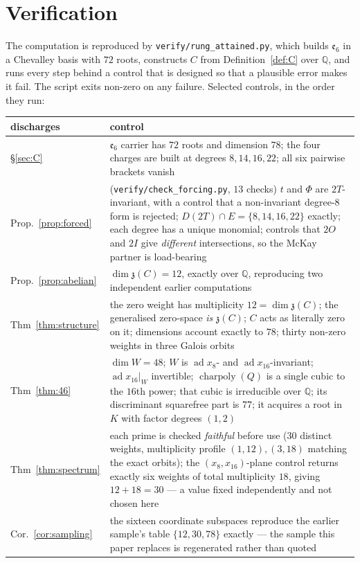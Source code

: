 \documentclass[11pt,a4paper]{article}
\theoremstyle{definition}
\theoremstyle{remark}
\newcommand{\esix}{\mathfrak{e}_6}
\newcommand{\z}{\mathfrak{z}}
\newcommand{\Q}{\mathbb{Q}}
\newcommand{\ad}{\operatorname{ad}}
\newcommand{\charpoly}{\operatorname{charpoly}}
\begin{document}
\appendix

\section{Verification}\label{app:verify}

The computation is reproduced by \texttt{verify/rung\_attained.py}, which builds $\esix$ in a
Chevalley basis with $72$ roots, constructs $C$ from Definition~\ref{def:C} over $\Q$, and runs
every step behind a control that is designed so that a plausible error makes it fail. The script
exits non-zero on any failure. Selected controls, in the order they run:

\begin{center}
\begin{tabular}{@{}lp{9.2cm}@{}}
\toprule
discharges & control \\
\midrule
\S\ref{sec:C}          & $\esix$ carrier has $72$ roots and dimension $78$; the four charges are built at degrees $8,14,16,22$; all six pairwise brackets vanish \\
Prop.~\ref{prop:forced} & (\texttt{verify/check\_forcing.py}, $13$ checks) $t$ and $\Phi$ are $2T$-invariant, with a control that a non-invariant degree-$8$ form is rejected; $D(2T)\cap E=\{8,14,16,22\}$ exactly; each degree has a unique monomial; controls that $2O$ and $2I$ give \emph{different} intersections, so the McKay partner is load-bearing \\
Prop.~\ref{prop:abelian} & $\dim\z(C)=12$, exactly over $\Q$, reproducing two independent earlier computations \\
Thm~\ref{thm:structure}  & the zero weight has multiplicity $12=\dim\z(C)$; the generalised zero-space \emph{is} $\z(C)$; $C$ acts as literally zero on it; dimensions account exactly to $78$; thirty non-zero weights in three Galois orbits \\
Thm~\ref{thm:46}         & $\dim W=48$; $W$ is $\ad x_8$- and $\ad x_{16}$-invariant; $\ad x_{16}|_W$ invertible; $\charpoly(Q)$ is a single cubic to the $16$th power; that cubic is irreducible over $\Q$; its discriminant squarefree part is $77$; it acquires a root in $K$ with factor degrees $(1,2)$ \\
Thm~\ref{thm:spectrum}   & each prime is checked \emph{faithful} before use ($30$ distinct weights, multiplicity profile $(1,12),(3,18)$ matching the exact orbits); the $(x_8,x_{16})$-plane control returns exactly six weights of total multiplicity $18$, giving $12+18=30$ --- a value fixed independently and not chosen here \\
Cor.~\ref{cor:sampling}  & the sixteen coordinate subspaces reproduce the earlier sample's table $\{12,30,78\}$ exactly --- the sample this paper replaces is regenerated rather than quoted \\
\bottomrule
\end{tabular}
\end{center}
\end{document}
